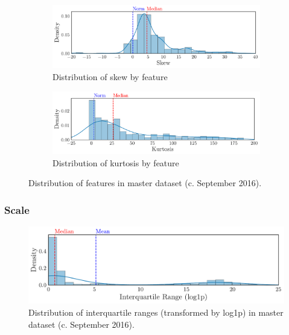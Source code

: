 \documentclass[../thesis/thesis.tex]{subfiles}
\begin{document}
\begin{figure}[!htb]
    \centering
    \begin{subfigure}{\textwidth}
        \includegraphics[width=\textwidth]{../figures/design/skew}
        \caption{Distribution of skew by feature}
        \label{fig:design:normality:skew}
    \end{subfigure}
    \begin{subfigure}{\textwidth}
        \includegraphics[width=\textwidth]{../figures/design/kurtosis}
        \caption{Distribution of kurtosis by feature}
        \label{fig:design:normality:kurtosis}
    \end{subfigure}
    \caption{Distribution of features in master dataset (c. September 2016).}
    \label{fig:design:normality}
\end{figure}

\subsubsection{Scale}


\begin{figure}[!htb]
    \centering
    \includegraphics[width=\textwidth]{../figures/design/scaling}
    \caption{Distribution of interquartile ranges (transformed by log1p) in master dataset (c. September 2016).}
    \label{fig:design:scaling}
\end{figure}
\end{document}
